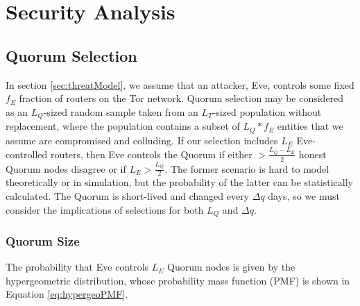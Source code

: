\documentclass{sig-alternate}
\begin{document}



\section{Security Analysis}
\label{sec:Analysis}

\subsection{Quorum Selection}


In section \ref{sec:threatModel}, we assume that an attacker, Eve, controls some fixed $ f_{E} $ fraction of routers on the Tor network. Quorum selection may be considered as an $ L_{Q} $-sized random sample taken from an $ L_{T} $-sized population without replacement, where the population contains a subset of $ L_{Q} * f_{E} $ entities that we assume are compromised and colluding. If our selection includes $ L_{E} $ Eve-controlled routers, then Eve controls the Quorum if either $ > \frac{L_{Q} - L_{E}}{2} $ honest Quorum nodes disagree or if $ L_{E} > \frac{L_{Q}}{2} $. The former scenario is hard to model theoretically or in simulation, but the probability of the latter can be statistically calculated. The Quorum is short-lived and changed every $ \Delta q $ days, so we must consider the implications of selections for both $ L_{Q} $ and $ \Delta q $.

\subsubsection{Quorum Size}

The probability that Eve controls $ L_{E} $ Quorum nodes is given by the hypergeometric distribution, whose probability mass function (PMF) is shown in Equation \ref{eq:hypergeoPMF}.
\end{document}
